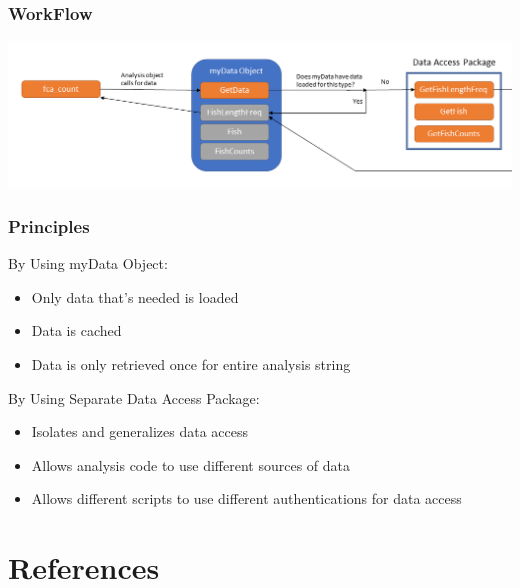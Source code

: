 \documentclass[
  letterpaper,
  DIV=11,
  numbers=noendperiod]{scrreprt}
\newlength{\cslhangindent}
\newenvironment{CSLReferences}[2] %
 {\begin{list}{}{%
  \setlength{\itemindent}{0pt}
  \setlength{\leftmargin}{0pt}
  \setlength{\parsep}{0pt}
  \ifodd #1
   \setlength{\leftmargin}{\cslhangindent}
   \setlength{\itemindent}{-1\cslhangindent}
  \fi
  \setlength{\itemsep}{#2\baselineskip}}}
 {\end{list}}
\begin{document}
\section*{WorkFlow}\label{workflow-1}


\includegraphics{ArchVis/Slide2.PNG}

\section*{Principles}\label{principles-1}


By Using myData Object:

\begin{itemize}
\item
  Only data that's needed is loaded
\item
  Data is cached
\item
  Data is only retrieved once for entire analysis string
\end{itemize}

By Using Separate Data Access Package:

\begin{itemize}
\item
  Isolates and generalizes data access
\item
  Allows analysis code to use different sources of data
\item
  Allows different scripts to use different authentications for data
  access
\end{itemize}

\part{References}

\label{refs}
\begin{CSLReferences}{0}{1}
\end{CSLReferences}
\end{document}
